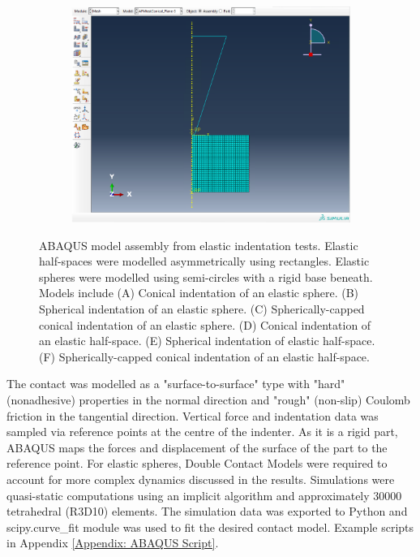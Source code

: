 \begin{figure}[H]
\begin{subfigure}{0.3\textwidth}
        \centering
        \caption{\label{fig: Capped-Plane-ABAQUS-setup}}
        \includegraphics[width=1\linewidth]{Figures/Capped-Plane-ABAQUS-setup.png}
    \end{subfigure}

    
    \caption{\label{fig: ABAQUS-Model-Setup}ABAQUS model assembly from elastic indentation tests. Elastic half-spaces were modelled asymmetrically using rectangles. Elastic spheres were modelled using semi-circles with a rigid base beneath. Models include (A) Conical indentation of an elastic sphere. (B) Spherical indentation of an elastic sphere. (C) Spherically-capped conical indentation of an elastic sphere. (D) Conical indentation of an elastic half-space. (E) Spherical indentation of elastic half-space. (F) Spherically-capped conical indentation of an elastic half-space.}
\end{figure}

The contact was modelled as a "surface-to-surface" type with "hard" (nonadhesive) properties in the normal direction and "rough" (non-slip) Coulomb friction in the tangential direction. Vertical force and indentation data was sampled via reference points at the centre of the indenter. As it is a rigid part, ABAQUS maps the forces and displacement of the surface of the part to the reference point. For elastic spheres, Double Contact Models\cite{dokukin2013quantitative,glaubitz2014novel} were required to account for more complex dynamics discussed in the results. Simulations were quasi-static computations using an implicit algorithm and approximately 30000 tetrahedral (R3D10) elements. The simulation data was exported to Python and scipy.curve\_fit module was used to fit the desired contact model. Example scripts in Appendix \ref{Appendix: ABAQUS Script}.
